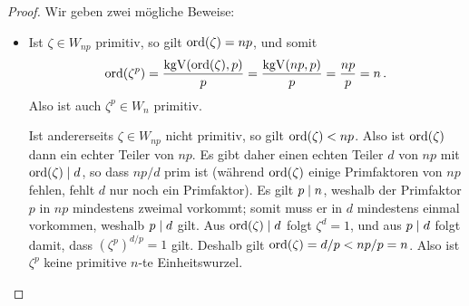 \begin{proof}
  Wir geben zwei mögliche Beweise:
  \begin{itemize}
    \item
      Ist $\zeta \in W_{np}$ primitiv, so gilt $\operatorname{ord}(\zeta) = np$, und somit
      \[
          \operatorname{ord}(\zeta^p)
        = \frac{ \operatorname{kgV}(\operatorname{ord}(\zeta), p) }{p}
        = \frac{ \operatorname{kgV}(np, p) }{p}
        = \frac{ np }{ p }
        = n \,.
      \]
      Also ist auch $\zeta^p \in W_n$ primitiv.
      
      Ist andererseits $\zeta \in W_{np}$ nicht primitiv, so gilt $\operatorname{ord}(\zeta) < np$.
      Also ist $\operatorname{ord}(\zeta)$ dann ein echter Teiler von $np$.
      Es gibt daher einen echten Teiler $d$ von $np$ mit $\operatorname{ord}(\zeta) \mathrel{|} d$, so dass $np/d$ prim ist
      (während $\operatorname{ord}(\zeta)$ einige Primfaktoren von $np$ fehlen, fehlt $d$ nur noch ein Primfaktor).
      Es gilt $p \mathrel{|} n$, weshalb der Primfaktor $p$ in $np$ mindestens zweimal vorkommt;
      somit muss er in $d$ mindestens einmal vorkommen, weshalb $p \mathrel{|} d$ gilt.
      Aus $\operatorname{ord}(\zeta) \mathrel{|} d$ folgt $\zeta^d = 1$, und aus $p \mathrel{|} d$ folgt damit, dass $(\zeta^p)^{d/p} = 1$ gilt.
      Deshalb gilt $\operatorname{ord}(\zeta) = d/p < np/p = n$.
      Also ist $\zeta^p$ keine primitive $n$-te Einheitswurzel.
      

\end{itemize}
\end{proof}
